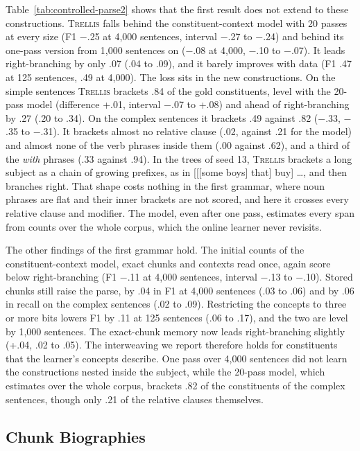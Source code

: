 \documentclass[11pt,letterpaper]{article}
\newcommand{\trellis}{\textsc{Trellis}}
\begin{document}
Table~\ref{tab:controlled-parse2} shows that the first result does not extend to these constructions. \trellis{} falls behind the constituent-context model with 20 passes at every size (F1 $-$.25 at 4,000 sentences, interval $-$.27 to $-$.24) and behind its one-pass version from 1,000 sentences on ($-$.08 at 4,000, $-$.10 to $-$.07). It leads right-branching by only .07 (.04 to .09), and it barely improves with data (F1 .47 at 125 sentences, .49 at 4,000).
The loss sits in the new constructions. On the simple sentences \trellis{} brackets .84 of the gold constituents, level with the 20-pass model (difference +.01, interval $-$.07 to +.08) and ahead of right-branching by .27 (.20 to .34). On the complex sentences it brackets .49 against .82 ($-$.33, $-$.35 to $-$.31).
It brackets almost no relative clause (.02, against .21 for the model) and almost none of the verb phrases inside them (.00 against .62), and a third of the \emph{with} phrases (.33 against .94).
In the trees of seed 13, \trellis{} brackets a long subject as a chain of growing prefixes, as in [[[some boys] that] buy] \dots, and then branches right. That shape costs nothing in the first grammar, where noun phrases are flat and their inner brackets are not scored, and here it crosses every relative clause and modifier. The model, even after one pass, estimates every span from counts over the whole corpus, which the online learner never revisits.

The other findings of the first grammar hold. The initial counts of the constituent-context model, exact chunks and contexts read once, again score below right-branching (F1 $-$.11 at 4,000 sentences, interval $-$.13 to $-$.10). Stored chunks still raise the parse, by .04 in F1 at 4,000 sentences (.03 to .06) and by .06 in recall on the complex sentences (.02 to .09). Restricting the concepts to three or more bits lowers F1 by .11 at 125 sentences (.06 to .17), and the two are level by 1,000 sentences. The exact-chunk memory now leads right-branching slightly (+.04, .02 to .05).
The interweaving we report therefore holds for constituents that the learner's concepts describe. One pass over 4,000 sentences did not learn the constructions nested inside the subject, while the 20-pass model, which estimates over the whole corpus, brackets .82 of the constituents of the complex sentences, though only .21 of the relative clauses themselves.

\subsection{Chunk Biographies}
\end{document}

